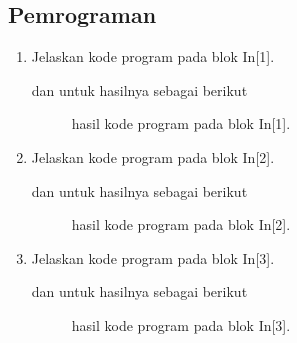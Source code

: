 \subsection{Pemrograman}
\begin{enumerate}
\item Jelaskan kode program pada blok  In[1].

dan untuk hasilnya sebagai berikut
\begin{figure}[!htbp]
      \caption{hasil kode program pada blok  In[1].}
      \label{c141}
      \end{figure}

\item Jelaskan kode program pada blok  In[2].

dan untuk hasilnya sebagai berikut
\begin{figure}[!htbp]
      \caption{hasil kode program pada blok  In[2].}
      \label{c142}
      \end{figure}


\item Jelaskan kode program pada blok  In[3].

dan untuk hasilnya sebagai berikut
\begin{figure}[!htbp]
      \caption{hasil kode program pada blok  In[3].}
      \label{c143}
      \end{figure}


\end{enumerate}
